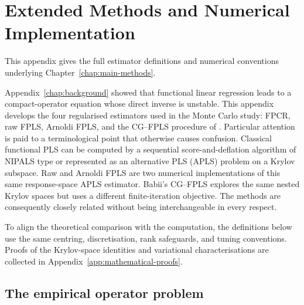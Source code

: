 \chapter{Extended Methods and Numerical Implementation}
\label{chap:methods}

This appendix gives the full estimator definitions and numerical conventions underlying
Chapter~\ref{chap:main-methods}.

Appendix~\ref{chap:background} showed that functional linear regression leads
to a compact-operator equation whose direct inverse is unstable.  This
appendix develops the four regularised estimators used in the Monte Carlo
study: FPCR, raw FPLS, Arnoldi FPLS, and the CG--FPLS procedure
of \textcite{babii_carrasco_tsafack_2026}.  Particular attention is paid to a
terminological point that otherwise causes confusion.  Classical functional
PLS can be computed by a sequential score-and-deflation algorithm of NIPALS
type or represented as an alternative PLS (APLS) problem on a Krylov
subspace.  Raw and Arnoldi FPLS are two numerical implementations of this
same response-space APLS estimator.  Babii's CG--FPLS explores the same
nested Krylov spaces but uses a different finite-iteration objective.  The
methods are consequently closely related without being interchangeable in
every respect.

To align the theoretical comparison with the computation, the definitions
below use the same centring, discretisation, rank safeguards, and tuning
conventions.  Proofs of the
Krylov-space identities and variational characterisations are collected in
Appendix~\ref{app:mathematical-proofs}.

\section{The empirical operator problem}
\label{sec:methods-empirical-operator}

